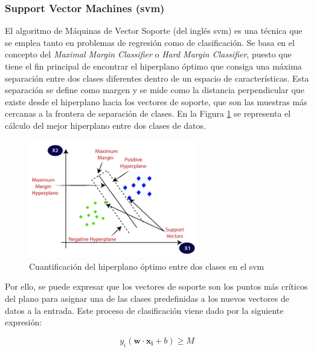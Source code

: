 \subsubsection{Support Vector Machines (\acrshort{svm})}
\label{sec:mlsvm}

El algoritmo de Máquinas de Vector Soporte (del inglés \gls{svm}) es una técnica que se emplea tanto en problemas de regresión como de clasificación. Se basa en el concepto del \textit{Maximal Margin Classifier} o \textit{Hard Margin Classifier}, puesto que tiene el fin principal de encontrar el hiperplano óptimo que consiga una máxima separación entre dos clases diferentes dentro de un espacio de características. Esta separación se define como margen y se mide como la distancia perpendicular que existe desde el hiperplano hacia los vectores de soporte, que son las muestras más cercanas a la frontera de separación de clases. En la Figura \ref{fig:svm} se representa el cálculo del mejor hiperplano entre dos clases de datos. \cite{svmmedium2} \cite{svmciencia}

\vspace{3mm}

\begin{figure}[h!]
    \centering
    \includegraphics[width=0.65\textwidth]{img/teoria/svm.png}
    \caption{Cuantificación del hiperplano óptimo entre dos clases en el \acrshort{svm} \cite{svmmedium2}}
    \label{fig:svm}
\end{figure}

\vspace{3mm}

Por ello, se puede expresar que los vectores de soporte son los puntos más críticos del plano para asignar una de las clases predefinidas a los nuevos vectores de datos a la entrada. Este proceso de clasificación viene dado por la siguiente expresión: \cite{svmmedium} 

\[ y_i(\mathbf{w} \cdot \mathbf{x_i} + b) \geq M\]

